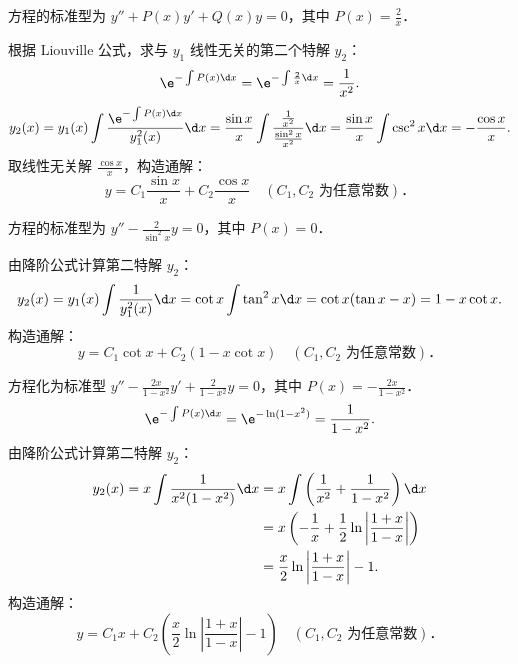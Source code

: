 \begin{solution}

    方程的标准型为 $y'' + P(x)y' + Q(x)y = 0$，其中 $P(x) = \frac{2}{x}$．

    根据 Liouville 公式，求与 $y_1$ 线性无关的第二个特解 $y_2$：
    \begin{equation}
        \e^{-\int P(x)\d x} = \e^{-\int \frac{2}{x}\d x} = \frac{1}{x^2}.
    \end{equation}
    \begin{equation}
        y_2(x) = y_1(x) \int \frac{\e^{-\int P(x)\d x}}{y_1^2(x)} \d x = \frac{\sin x}{x} \int \frac{\frac{1}{x^2}}{\frac{\sin^2 x}{x^2}} \d x = \frac{\sin x}{x} \int \csc^2 x \d x = -\frac{\cos x}{x}.
    \end{equation}
    取线性无关解 $\frac{\cos x}{x}$，构造通解：
    \begin{equation}
        \boxed{y = C_1 \frac{\sin x}{x} + C_2 \frac{\cos x}{x} \quad (C_1, C_2 \text{ 为任意常数})．}
    \end{equation}


    方程的标准型为 $y'' - \frac{2}{\sin^2 x}y = 0$，其中 $P(x) = 0$．

    由降阶公式计算第二特解 $y_2$：
    \begin{equation}
        y_2(x) = y_1(x) \int \frac{1}{y_1^2(x)} \d x = \cot x \int \tan^2 x \d x = \cot x (\tan x - x) = 1 - x \cot x.
    \end{equation}
    构造通解：
    \begin{equation}
        \boxed{y = C_1 \cot x + C_2 (1 - x \cot x) \quad (C_1, C_2 \text{ 为任意常数})．}
    \end{equation}


    方程化为标准型 $y'' - \frac{2x}{1 - x^2}y' + \frac{2}{1 - x^2}y = 0$，其中 $P(x) = -\frac{2x}{1 - x^2}$．
    \begin{equation}
        \e^{-\int P(x)\d x} = \e^{-\ln(1 - x^2)} = \frac{1}{1 - x^2}.
    \end{equation}
    由降阶公式计算第二特解 $y_2$：
    \begin{equation}
        \begin{aligned}
            y_2(x) = x \int \frac{1}{x^2(1 - x^2)} \d x & = x \int \left( \frac{1}{x^2} + \frac{1}{1 - x^2} \right) \d x                     \\
                                                        & = x \left( -\frac{1}{x} + \frac{1}{2}\ln\left| \frac{1 + x}{1 - x} \right| \right) \\
                                                        & = \frac{x}{2}\ln\left| \frac{1 + x}{1 - x} \right| - 1.
        \end{aligned}
    \end{equation}
    构造通解：
    \begin{equation}
        \boxed{y = C_1 x + C_2 \left( \frac{x}{2}\ln\left| \frac{1 + x}{1 - x} \right| - 1 \right) \quad (C_1, C_2 \text{ 为任意常数})．}
    \end{equation}
\end{solution}

